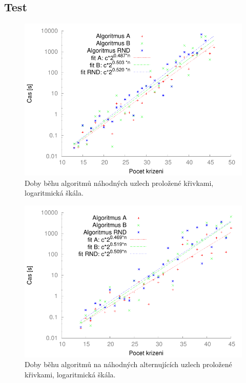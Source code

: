 \subsection{Test}

\begin{figure}[p]\centering
\includegraphics{../img/knotsFIT}
\caption{Doby běhu algoritmů náhodných uzlech proložené křivkami, logaritmická škála.}
\label{obr03:knotSrov}
\end{figure}

\begin{figure}[p]\centering
\includegraphics{../img/alt_knotsFIT}
\caption{Doby běhu algoritmů na náhodných alternujících uzlech proložené křivkami, logaritmická škála.}
\label{obr03:altSrov}
\end{figure}

